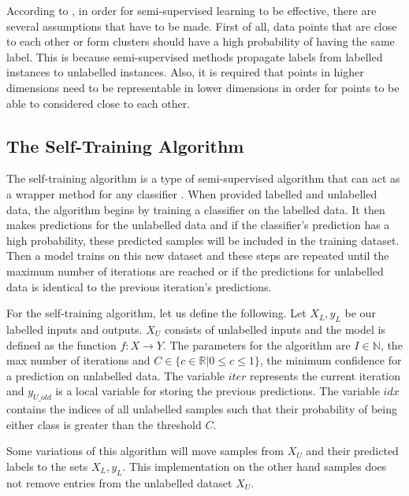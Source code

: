 \documentclass[../main.tex]{subfiles}
\begin{document}
According to \cite{chapelle2006semi}, in order for semi-supervised learning to be effective, there are several assumptions that have to be made. First of all, data points that are close to each other or form clusters should have a high probability of having the same label. This is because semi-supervised methods propagate labels from labelled instances to unlabelled instances. Also, it is required that points in higher dimensions need to be representable in lower dimensions in order for points to be able to considered close to each other. 

\subsection{The Self-Training Algorithm} \label{section:selfTrain}

The self-training algorithm is a type of semi-supervised algorithm that can act as a wrapper method for any classifier \cite{triguero2015self}. When provided labelled and unlabelled data, the algorithm begins by training a classifier on the labelled data. It then makes predictions for the unlabelled data and if the classifier's prediction has a high probability, these predicted samples will be included in the training dataset. Then a model trains on this new dataset and these steps are repeated until the maximum number of iterations are reached or if the predictions for unlabelled data is identical to the previous iteration's predictions. 

For the self-training algorithm, let us define the following. Let $X_L, y_L$ be our labelled inputs and outputs. $X_U$ consists of unlabelled inputs and the model is defined as the function $f:X \rightarrow Y$. The parameters for the algorithm are $I \in \mathbb{N}$, the max number of iterations and $C \in \{c \in \mathbb{R} | 0 \leq c \leq 1\}$, the minimum confidence for a prediction on unlabelled data. The variable $iter$ represents the current iteration and $y_{U\_old}$ is a local variable for storing the previous predictions. The variable $idx$ contains the indices of all unlabelled samples such that their probability of being either class is greater than the threshold $C$. 

Some variations of this algorithm will move samples from $X_U$ and their predicted labels to the sets $X_L,y_L$. This implementation on the other hand samples does not remove entries from the unlabelled dataset $X_U$.
\end{document}
